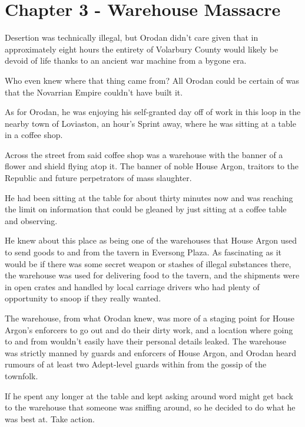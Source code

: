 \documentclass[a4paper,10pt]{book}
\begin{document}
\section*{Chapter 3 - Warehouse Massacre}
%
\par
Desertion was technically illegal, but Orodan didn’t care given that in approximately eight hours the entirety of Volarbury County would likely be devoid of life thanks to an ancient war machine from a bygone era.\par
Who even knew where that thing came from? All Orodan could be certain of was that the Novarrian Empire couldn’t have built it.\par
As for Orodan, he was enjoying his self-granted day off of work in this loop in the nearby town of Loviaston, an hour’s Sprint away, where he was sitting at a table in a coffee shop.\par
Across the street from said coffee shop was a warehouse with the banner of a flower and shield flying atop it. The banner of noble House Argon, traitors to the Republic and future perpetrators of mass slaughter.\par
He had been sitting at the table for about thirty minutes now and was reaching the limit on information that could be gleaned by just sitting at a coffee table and observing.\par
He knew about this place as being one of the warehouses that House Argon used to send goods to and from the tavern in Eversong Plaza. As fascinating as it would be if there was some secret weapon or stashes of illegal substances there, the warehouse was used for delivering food to the tavern, and the shipments were in open crates and handled by local carriage drivers who had plenty of opportunity to snoop if they really wanted.\par
The warehouse, from what Orodan knew, was more of a staging point for House Argon’s enforcers to go out and do their dirty work, and a location where going to and from wouldn’t easily have their personal details leaked. The warehouse was strictly manned by guards and enforcers of House Argon, and Orodan heard rumours of at least two Adept-level guards within from the gossip of the townfolk.\par
If he spent any longer at the table and kept asking around word might get back to the warehouse that someone was sniffing around, so he decided to do what he was best at. Take action.\par
\end{document}
